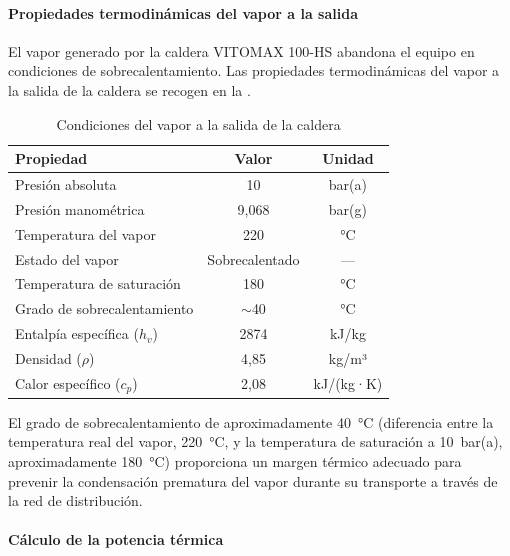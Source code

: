 \paragraph{Propiedades termodinámicas del vapor a la salida}

El vapor generado por la caldera VITOMAX 100-HS abandona el equipo en condiciones de sobrecalentamiento. Las propiedades termodinámicas del vapor a la salida de la caldera se recogen en la .

\begin{table}[H]
	\centering
	\caption{Condiciones del vapor a la salida de la caldera}
	\label{tab:condiciones-salida-caldera}
	\begin{tabular}{lcc}
		\toprule
		\textbf{Propiedad}          & \textbf{Valor} & \textbf{Unidad} \\
		\midrule
		Presión absoluta            & 10             & bar(a)          \\
		Presión manométrica         & 9,068          & bar(g)          \\
		Temperatura del vapor       & 220            & °C              \\
		Estado del vapor            & Sobrecalentado & ---             \\
		Temperatura de saturación   & 180            & °C              \\
		Grado de sobrecalentamiento & $\sim$40       & °C              \\
		Entalpía específica ($h_v$) & 2874           & kJ/kg           \\
		Densidad ($\rho$)           & 4,85           & kg/m³           \\
		Calor específico ($c_p$)    & 2,08           & kJ/(kg·K)       \\
		\bottomrule
	\end{tabular}
\end{table}

El grado de sobrecalentamiento de aproximadamente 40~°C (diferencia entre la temperatura real del vapor, 220~°C, y la temperatura de saturación a 10~bar(a), aproximadamente 180~°C) proporciona un margen térmico adecuado para prevenir la condensación prematura del vapor durante su transporte a través de la red de distribución.

\paragraph{Cálculo de la potencia térmica}

